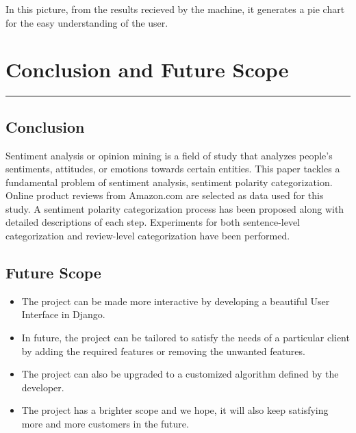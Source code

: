 In this picture, from the results recieved by the machine, it generates a pie chart for the easy understanding of the user.




\chapter{Conclusion and Future Scope}\hrule
\label{Chapter:6}
\section{Conclusion}

Sentiment analysis or opinion mining is a field of study that analyzes people’s sentiments, attitudes, or emotions towards certain entities. This paper tackles a fundamental problem of sentiment analysis, sentiment polarity categorization. Online product reviews from Amazon.com are selected as data used for this study. A sentiment polarity categorization process  has been proposed along with detailed descriptions of each step. Experiments for both sentence-level categorization and review-level categorization have been performed.\\

\section{Future Scope}
\begin{itemize}
	\item The project can be made more interactive by developing a beautiful User Interface in Django.
	\item In future, the project can be tailored to satisfy the needs of a particular client by adding the required features or removing the unwanted features.
	\item The project can also be upgraded to a customized algorithm defined by the developer.
	\item The project has a brighter scope and we hope, it will also keep satisfying more and more customers in the future.
\end{itemize}


